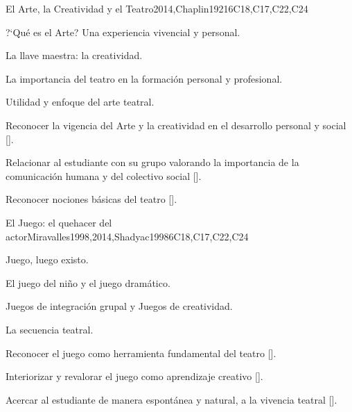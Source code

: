 \begin{syllabus}
\begin{outcomes}
    \item {}
    \item {}
    \item {}
    \item {}
\end{outcomes}

\begin{competences}
    \item {}
    \item {}
	\item {}
    \item {}
\end{competences}

\begin{unit}{}{El Arte, la Creatividad y el Teatro}{2014,Chaplin1921}{6}{C18,C17,C22,C24}
\begin{topics}
	\item ?`Qué es el Arte? Una experiencia vivencial y personal.
	\item La llave maestra: la creatividad.
	\item La importancia del teatro en la formación personal y profesional.
	\item Utilidad y enfoque del arte teatral.
\end{topics}
\begin{learningoutcomes}
	\item Reconocer la vigencia del Arte y la creatividad en el desarrollo personal y social [\Usage].
	\item Relacionar al estudiante con su grupo valorando la importancia de la comunicación humana y del colectivo  social [\Usage].
	\item Reconocer nociones  básicas del teatro [\Usage].
\end{learningoutcomes}
\end{unit}

\begin{unit}{}{El Juego: el  quehacer del actor}{Miravalles1998,2014,Shadyac1998}{6}{C18,C17,C22,C24}
\begin{topics}
	\item Juego, luego existo.
	\item El juego del niño y el juego dramático.
	\item Juegos de integración grupal y Juegos de creatividad.
	\item La secuencia teatral.
\end{topics}
\begin{learningoutcomes}
	\item Reconocer el juego como herramienta fundamental del teatro [\Usage].
	\item Interiorizar y revalorar el juego como aprendizaje creativo [\Usage].
	\item Acercar al estudiante de manera espontánea y natural, a la vivencia teatral [\Usage].
\end{learningoutcomes}
\end{unit}


\end{syllabus}
